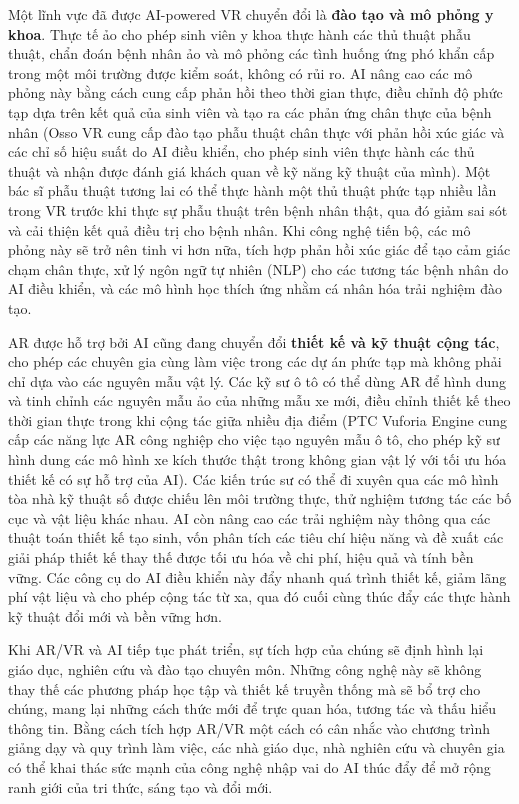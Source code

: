 Một lĩnh vực đã được AI-powered VR chuyển đổi là \textbf{đào tạo và mô phỏng y khoa}. Thực tế ảo cho phép sinh viên y khoa thực hành các thủ thuật phẫu thuật, chẩn đoán bệnh nhân ảo và mô phỏng các tình huống ứng phó khẩn cấp trong một môi trường được kiểm soát, không có rủi ro. AI nâng cao các mô phỏng này bằng cách cung cấp phản hồi theo thời gian thực, điều chỉnh độ phức tạp dựa trên kết quả của sinh viên và tạo ra các phản ứng chân thực của bệnh nhân (Osso VR cung cấp đào tạo phẫu thuật chân thực với phản hồi xúc giác và các chỉ số hiệu suất do AI điều khiển, cho phép sinh viên thực hành các thủ thuật và nhận được đánh giá khách quan về kỹ năng kỹ thuật của mình). Một bác sĩ phẫu thuật tương lai có thể thực hành một thủ thuật phức tạp nhiều lần trong VR trước khi thực sự phẫu thuật trên bệnh nhân thật, qua đó giảm sai sót và cải thiện kết quả điều trị cho bệnh nhân. Khi công nghệ tiến bộ, các mô phỏng này sẽ trở nên tinh vi hơn nữa, tích hợp phản hồi xúc giác để tạo cảm giác chạm chân thực, xử lý ngôn ngữ tự nhiên (NLP) cho các tương tác bệnh nhân do AI điều khiển, và các mô hình học thích ứng nhằm cá nhân hóa trải nghiệm đào tạo.

AR được hỗ trợ bởi AI cũng đang chuyển đổi \textbf{thiết kế và kỹ thuật cộng tác}, cho phép các chuyên gia cùng làm việc trong các dự án phức tạp mà không phải chỉ dựa vào các nguyên mẫu vật lý. Các kỹ sư ô tô có thể dùng AR để hình dung và tinh chỉnh các nguyên mẫu ảo của những mẫu xe mới, điều chỉnh thiết kế theo thời gian thực trong khi cộng tác giữa nhiều địa điểm (PTC Vuforia Engine cung cấp các năng lực AR công nghiệp cho việc tạo nguyên mẫu ô tô, cho phép kỹ sư hình dung các mô hình xe kích thước thật trong không gian vật lý với tối ưu hóa thiết kế có sự hỗ trợ của AI). Các kiến trúc sư có thể đi xuyên qua các mô hình tòa nhà kỹ thuật số được chiếu lên môi trường thực, thử nghiệm tương tác các bố cục và vật liệu khác nhau. AI còn nâng cao các trải nghiệm này thông qua các thuật toán thiết kế tạo sinh, vốn phân tích các tiêu chí hiệu năng và đề xuất các giải pháp thiết kế thay thế được tối ưu hóa về chi phí, hiệu quả và tính bền vững. Các công cụ do AI điều khiển này đẩy nhanh quá trình thiết kế, giảm lãng phí vật liệu và cho phép cộng tác từ xa, qua đó cuối cùng thúc đẩy các thực hành kỹ thuật đổi mới và bền vững hơn.

Khi AR/VR và AI tiếp tục phát triển, sự tích hợp của chúng sẽ định hình lại giáo dục, nghiên cứu và đào tạo chuyên môn. Những công nghệ này sẽ không thay thế các phương pháp học tập và thiết kế truyền thống mà sẽ bổ trợ cho chúng, mang lại những cách thức mới để trực quan hóa, tương tác và thấu hiểu thông tin. Bằng cách tích hợp AR/VR một cách có cân nhắc vào chương trình giảng dạy và quy trình làm việc, các nhà giáo dục, nhà nghiên cứu và chuyên gia có thể khai thác sức mạnh của công nghệ nhập vai do AI thúc đẩy để mở rộng ranh giới của tri thức, sáng tạo và đổi mới.

